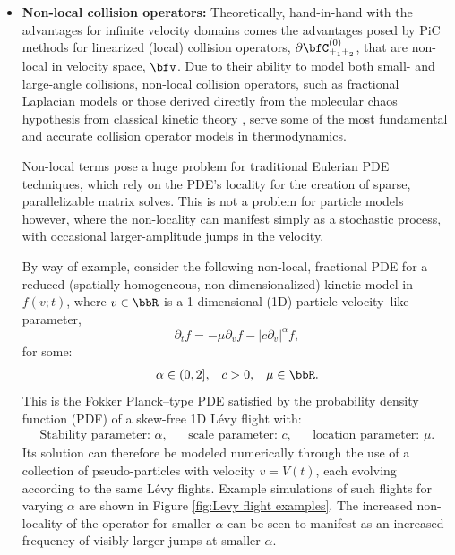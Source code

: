 \begin{itemize}
        \item  {\bf Non-local collision operators:} Theoretically, hand-in-hand with the advantages for infinite velocity domains comes the advantages posed by PiC methods for linearized (local) collision operators, $\partial\bfC_{\pm_{1}\pm_{2}}^{(0)}$, that are non-local in velocity space, $\bfv$. Due to their ability to model both small- and large-angle collisions, non-local collision operators, such as fractional Laplacian models \cite{Cho_2015, Sakomoto_2016, Kiselev_Schmalian_2019} or those derived directly from the molecular chaos hypothesis from classical kinetic theory \cite{Lerner_Trigg_1991}, serve some of the most fundamental and accurate collision operator models in thermodynamics.
        
        Non-local terms pose a huge problem for traditional Eulerian PDE techniques, which rely on the PDE's locality for the creation of sparse, parallelizable matrix solves. This is not a problem for particle models however, where the non-locality can manifest simply as a stochastic process, with occasional larger-amplitude jumps in the velocity.

        By way of example, consider the following non-local, fractional PDE for a reduced (spatially-homogeneous, non-dimensionalized) kinetic model in $f(v; t)$, where $v  \in  \bbR$ is a 1-dimensional (1D) particle velocity--like parameter,
        \begin{equation}\label{eqn:reduced Boltzmann equation}
            \partial_{t}f  =  - \mu\partial_{v}f - |c\partial_{v}|^{\alpha}f,
        \end{equation}
        for some:
        \begin{align*}
            \alpha  \in  (0, 2],  &&
            c       >    0,       &&
            \mu     \in  \bbR.
        \end{align*}
        This is the Fokker Planck--type PDE satisfied by the probability density function (PDF) of a skew-free 1D Lévy flight \cite{Chechkin_et_al_2008} with:
        \begin{align*}
            \text{Stability parameter: } \alpha,  &&
            \text{scale parameter: } c,           &&
            \text{location parameter: } \mu.
        \end{align*}
        Its solution can therefore be modeled numerically through the use of a collection of pseudo-particles with velocity $v  =  V(t)$, each evolving according to the same Lévy flights. Example simulations of such flights for varying $\alpha$ are shown in Figure \ref{fig:Levy flight examples}. The increased non-locality of the operator for smaller $\alpha$ can be seen to manifest as an increased frequency of visibly larger jumps at smaller $\alpha$.


\end{itemize}
